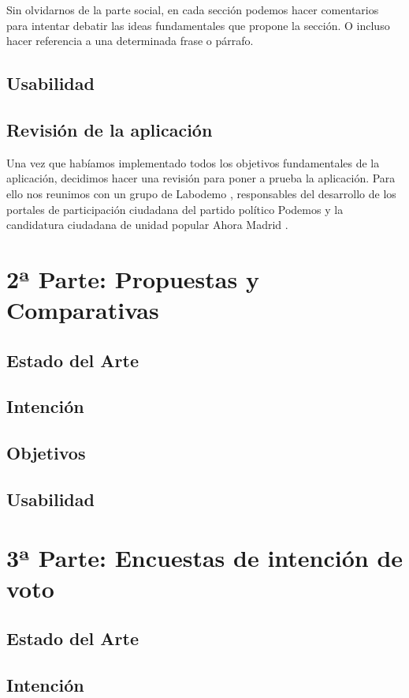 Sin olvidarnos de la parte social, en cada sección podemos hacer comentarios para intentar debatir las ideas fundamentales que propone la sección. O incluso hacer referencia a una determinada frase o párrafo.
	\subsection{Usabilidad}
	
	\subsection{Revisión de la aplicación}
Una vez que habíamos implementado todos los objetivos fundamentales de la aplicación, decidimos hacer una revisión para poner a prueba la aplicación. Para ello nos reunimos con un grupo de Labodemo \cite{ref:labodemo}, responsables del desarrollo de los portales de participación ciudadana del partido político Podemos \cite{ref:podemos} y la candidatura ciudadana de unidad popular Ahora Madrid \cite{ref:ahoramadrid}.
  
\section{2ª Parte: Propuestas y Comparativas}
  \subsection{Estado del Arte}

  \subsection{Intención}
  \subsection{Objetivos}
  \subsection{Usabilidad}
  
\section{3ª Parte: Encuestas de intención de voto}
  \subsection{Estado del Arte}

  \subsection{Intención}
